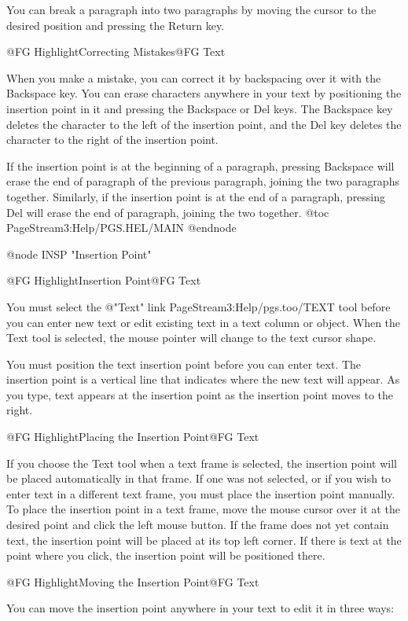 You can break a paragraph into two paragraphs by moving the cursor to the
desired position and pressing the Return key.

@{FG Highlight}Correcting Mistakes@{FG Text}

When you make a mistake, you can correct it by backspacing over it with
the Backspace key. You can erase characters anywhere in your text by
positioning the insertion point in it and pressing the Backspace or Del
keys. The Backspace key deletes the character to the left of the
insertion point, and the Del key deletes the character to the right of
the insertion point.

If the insertion point is at the beginning of a paragraph, pressing
Backspace will erase the end of paragraph of the previous paragraph,
joining the two paragraphs together. Similarly, if the insertion point is
at the end of a paragraph, pressing Del will erase the end of paragraph,
joining the two together.
@toc PageStream3:Help/PGS.HEL/MAIN
@endnode

@node INSP "Insertion Point"

@{FG Highlight}Insertion Point@{FG Text}

You must select the @{"Text" link PageStream3:Help/pgs.too/TEXT} tool before you can enter new text or edit
existing text in a text column or object. When the Text tool is selected,
the mouse pointer will change to the text cursor shape.

You must position the text insertion point before you can enter text. The
insertion point is a vertical line that indicates where the new text will
appear. As you type, text appears at the insertion point as the insertion
point moves to the right.

@{FG Highlight}Placing the Insertion Point@{FG Text}

If you choose the Text tool when a text frame is selected, the insertion
point will be placed automatically in that frame. If one was not
selected, or if you wish to enter text in a different text frame, you
must place the insertion point manually. To place the insertion point in
a text frame, move the mouse cursor over it at the desired point and
click the left mouse button. If the frame does not yet contain text, the
insertion point will be placed at its top left corner. If there is text
at the point where you click, the insertion point will be positioned
there.

@{FG Highlight}Moving the Insertion Point@{FG Text}

You can move the insertion point anywhere in your text to edit it in
three ways:

